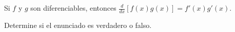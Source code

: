 \item Si $f$ y $g$ son diferenciables, entonces $\frac{d}{dx} [f(x)g(x)] = f'(x)g'(x)$.
\par
Determine si el enunciado es verdadero o falso.
